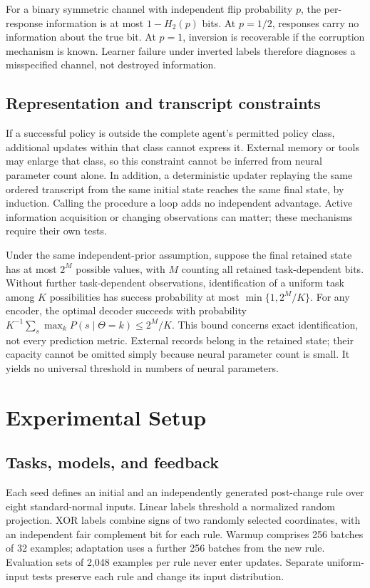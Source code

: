 \documentclass[11pt]{article}
\begin{document}
For a binary symmetric channel with independent flip probability $p$, the
per-response information is at most $1-H_2(p)$ bits. At $p=1/2$, responses
carry no information about the true bit. At $p=1$, inversion is recoverable
if the corruption mechanism is known. Learner failure under inverted labels
therefore diagnoses a misspecified channel, not destroyed information.

\subsection{Representation and transcript constraints}
If a successful policy is outside the complete agent's permitted policy class,
additional updates within that class cannot express it. External memory or
tools may enlarge that class, so this constraint cannot be inferred from
neural parameter count alone. In addition, a deterministic updater replaying
the same ordered transcript from the same initial state reaches the same
final state, by induction. Calling the procedure a loop adds no independent
advantage. Active information acquisition or changing observations can matter;
these mechanisms require their own tests.

Under the same independent-prior assumption, suppose the final retained state has at
most $2^M$ possible values, with $M$ counting all retained task-dependent bits.
Without further task-dependent observations, identification of a uniform task
among $K$ possibilities has success probability at most
$\min\{1,2^M/K\}$. For any encoder, the optimal decoder succeeds with probability
$K^{-1}\sum_s\max_k P(s\mid\Theta=k)\leq 2^M/K$.
This bound concerns exact identification, not every prediction metric. External
records belong in the retained state; their capacity cannot be omitted simply
because neural parameter count is small. It yields no universal threshold in
numbers of neural parameters.

\section{Experimental Setup}
\subsection{Tasks, models, and feedback}
Each seed defines an initial and an independently generated post-change rule
over eight standard-normal inputs. Linear labels threshold a normalized random
projection. XOR labels combine signs of two randomly selected coordinates,
with an independent fair complement bit for each rule. Warmup comprises 256
batches of 32 examples; adaptation uses a further 256 batches from the new
rule. Evaluation sets of 2,048 examples per rule never enter updates. Separate
uniform-input tests preserve each rule and change its input distribution.
\end{document}
